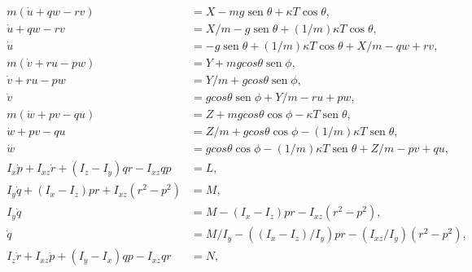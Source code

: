 \documentclass[12pt,a4paper]{article}
\DeclareMathOperator{\sen}{sen}
\begin{document}
\begin{align}
    \begin{split}
        m(\dot{u} + qw - rv) &= X - mg\sen\theta + \kappa T \cos\theta,\\
        \dot{u} + qw - rv &= X/m - g\sen\theta + (1/m)\kappa T \cos\theta,\\
        \dot{u} &= - g\sen\theta + (1/m)\kappa T \cos\theta + X/m - qw + rv ,\\
        m(\dot{v} + ru - pw) &= Y + mg cos\theta \sen\phi,\\
        \dot{v} + ru - pw &= Y/m + g cos\theta \sen\phi,\\
        \dot{v} &= g cos\theta \sen\phi + Y/m - ru + pw ,\\
        m(\dot{w} + pv - qu) &= Z + mg cos\theta \cos\phi - \kappa T \sen\theta,\\
        \dot{w} + pv - qu &= Z/m + g cos\theta \cos\phi - (1/m)\kappa T \sen\theta,\\
        \dot{w} &= g cos\theta \cos\phi - (1/m)\kappa T \sen\theta + Z/m  - pv + qu ,\\
        I_x \dot{p} + I_{xz} \dot{r} + (I_z - I_y)qr - I_{xz}qp &= L,\\
        I_y \dot{q} + (I_x - I_z)pr + I_{xz}(r^2 - p^2) &= M,\\
        I_y \dot{q} &= M - (I_x - I_z)pr - I_{xz}(r^2 - p^2) ,\\
        \dot{q} &= M/I_y  - ((I_x - I_z)/I_y) pr - (I_{xz}/I_y) (r^2 - p^2) ,\\
        I_z \dot{r} + I_{xz} \dot{p} + (I_y - I_x)qp - I_{xz}qr &= N,
    \end{split}
    \label{eq:boeing747-nonlinear-model_2}
\end{align}
\end{document}
